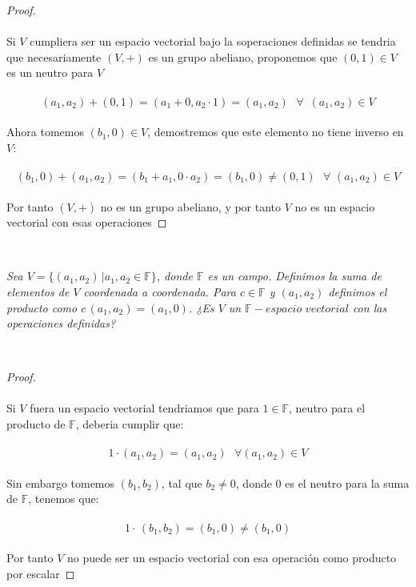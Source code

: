 \documentclass[11pt,letterpaper]{article}
\begin{document}
\begin{proof}\,\\
	\,\\
	Si $V$ cumpliera ser un espacio vectorial bajo la soperaciones definidas se tendria que necesariamente $(V,+)$ es un grupo abeliano, proponemos que $(0,1)\in V$ es un neutro para $V$
	\,\\
	\,\\
	\begin{equation*}
		(a_1,a_2)+(0,1)=(a_1+0,a_2\cdot 1)=(a_1,a_2)\,\,\,\,\forall\,\,\,(a_1,a_2)\in V
	\end{equation*}\,\\
	Ahora tomemos $(b_1,0)\in V$, demostremos que este elemento no tiene inverso en $V$:\,\\
	\,\\
	\begin{equation*}
		(b_1,0)+(a_1,a_2)=(b_1+a_1,0\cdot a_2)=(b_1,0)\neq (0,1)\,\,\,\,\forall\,\,(a_1,a_2)\in V
	\end{equation*}\,\\
	Por tanto $(V,+)$ no es un grupo abeliano, y por tanto $V$ no es un espacio vectorial con esas operaciones    
\end{proof}\,\\
\begin{tcolorbox}[
	title = \textcolor{black}{\textcolor{white}{Problema 8}},]
\textit{Sea $V=\{(a_1,a_2)\,|a_1,a_2\in \mathbb{F}\}$, donde $\mathbb{F}$ es un campo. Definimos la suma de elementos de $V$ 
coordenada a coordenada. Para $c\in \mathbb{F}$ y $(a_1,a_2)$ definimos el producto como $c\,(a_1,a_2)=(a_1,0)$. ¿Es $V$
un $\mathbb{F}-espacio\,\,vectorial$ con las operaciones definidas?}
\end{tcolorbox}\,\\
\begin{proof}\,\\
	\,\\
	Si $V$ fuera un espacio vectorial tendriamos que para $1\in \mathbb{F}$, neutro para el producto de $\mathbb{F}$, deberia cumplir que:\,\\
	\,\\
	\begin{equation*}
		1\cdot(a_1,a_2)=(a_1,a_2)\,\,\,\,\forall (a_1,a_2)\in V
	\end{equation*}\,\\
	Sin embargo tomemos $(b_1,b_2)$, tal que $b_2\neq 0$, donde $0$ es el neutro para la suma de $\mathbb{F}$, tenemos que:\,\\
	\,\\
	\begin{equation*}
		1\cdot\,(b_1,b_2)=(b_1,0)\neq (b_1,0)
	\end{equation*}\,\\
	Por tanto $V$ no puede ser un espacio vectorial con esa operaci\'on como producto por escalar
    
\end{proof}\,\\
\end{document}

